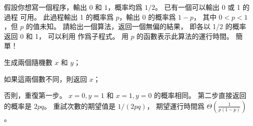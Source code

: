 \startEXERCISE \DIFFICULT
假設你想寫一個程序，輸出 $0$ 和 $1$，概率均爲 $1/2$。
已有一個可以輸出 0 或 1 的過程  可用。
此過程輸出 1 的概率爲 $p$，輸出 0 的概率爲 $1-p$，
其中 $0<p<1$，但 $p$ 的值未知。
請給出一個算法，返回一個無偏的結果，
即各以 1/2 的概率返回 0 和 1，
可以利用  作爲子程式。
用 $p$ 的函數表示此算法的運行時間。
\stopEXERCISE
\startANSWER
簡單！
\startigBase[n]
\item 生成兩個隨機數 $x$ 和 $y$；
\item 如果這兩個數不同，則返回 $x$；
\item 否則，重復第一步。
\stopigBase
$x=0, y=1$ 和 $x=1, y=0$ 的概率相同。
第二步直接返回的概率是 $2pq$。
重試次數的期望值是 $1/(2pq)$，
期望運行時間爲 $\Theta(\frac{1}{p(1-p)})$。
\stopANSWER

\stopsection
